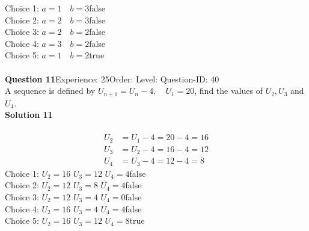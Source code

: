 \documentclass{article}
\begin{document}
Choice 1: \hspace{20pt}$a=1\quad b=3$\hspace{20pt}false\\
Choice 2: \hspace{20pt}$a=2 \quad b=3$\hspace{20pt}false\\
Choice 3: \hspace{20pt}$a=2 \quad b=2$\hspace{20pt}false\\
Choice 4: \hspace{20pt}$a=3 \quad b=2$\hspace{20pt}false\\
Choice 5: \hspace{20pt}$a=1 \quad b=2$\hspace{20pt}true\\
\\[4pt]
\noindent\textbf{Question 11}\hspace{20pt}Experience: 25\hspace{20pt}Order: \hspace{20pt}Level: \hspace{20pt}Question-ID: 40\\[2pt]
A sequence is defined by $U_{n+1}=U_n-4, \quad U_1=20$, find the values of $U_2,U_3$ and $U_4$.\\[4pt]
\noindent\textbf{Solution 11}\\[2pt]
\\[-35pt]\begin{align*}
U_2&=U_1-4=20-4=16\\[2pt]
U_3&=U_2-4=16-4=12\\[2pt]
U_4&=U_3-4=12-4=8
\end{align*}
Choice 1: \hspace{20pt}$U_2=16 \,\, U_3=12 \,\, U_4=4$\hspace{20pt}false\\
Choice 2: \hspace{20pt}$U_2=12 \,\, U_3=8 \,\, U_4=4$\hspace{20pt}false\\
Choice 3: \hspace{20pt}$U_2=12 \,\, U_3=4 \,\, U_4=0$\hspace{20pt}false\\
Choice 4: \hspace{20pt}$U_2=16 \,\, U_3=4 \,\, U_4=4$\hspace{20pt}false\\
Choice 5: \hspace{20pt}$U_2=16 \,\, U_3=12 \,\, U_4=8$\hspace{20pt}true\\
\end{document}
